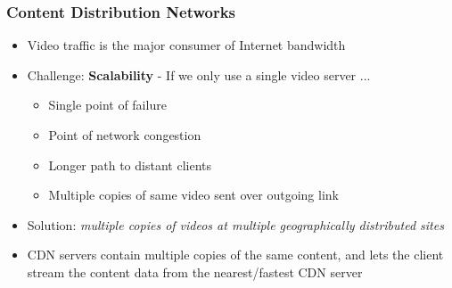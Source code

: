 \subsubsection{Content Distribution Networks}
\begin{itemize}
	\item Video traffic is the major consumer of Internet bandwidth
	\item Challenge: \textbf{Scalability} - If we only use a single video server ...
	\begin{itemize}
		\item Single point of failure
		\item Point of network congestion
		\item Longer path to distant clients
		\item Multiple copies of same video sent over outgoing link
	\end{itemize}
	\item Solution: \textit{multiple copies of videos at multiple geographically distributed sites}
	\item CDN servers contain multiple copies of the same content, and lets the client stream the content data from the nearest/fastest CDN server
\end{itemize}

\pagebreak
